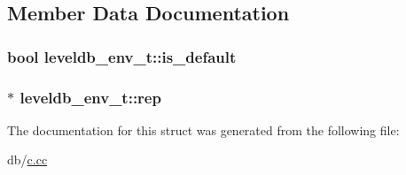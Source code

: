 \subsection{Member Data Documentation}
\hypertarget{structleveldb__env__t_a53e285385a628e932128aec1f0fe1dae}{}
\subsubsection[{is\+\_\+default}]{\setlength{\rightskip}{0pt plus 5cm}bool leveldb\+\_\+env\+\_\+t\+::is\+\_\+default}\label{structleveldb__env__t_a53e285385a628e932128aec1f0fe1dae}
\hypertarget{structleveldb__env__t_ad41038b41aebaf7ffba1a4bbfaa8b539}{}
\subsubsection[{rep}]{$\ast$ leveldb\+\_\+env\+\_\+t\+::rep}\label{structleveldb__env__t_ad41038b41aebaf7ffba1a4bbfaa8b539}


The documentation for this struct was generated from the following file\+:\begin{DoxyCompactItemize}
\item 
db/\hyperlink{c_8cc}{c.\+cc}\end{DoxyCompactItemize}
